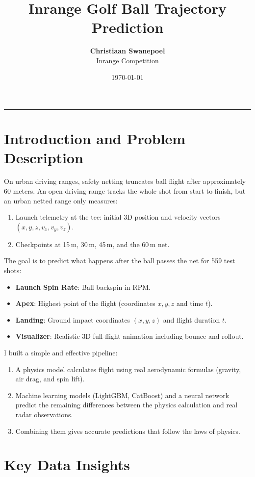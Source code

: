 \documentclass[11pt,a4paper]{article}
\title{\textbf{Inrange Golf Ball Trajectory Prediction}}
\author{\textbf{Christiaan Swanepoel} \\ Inrange Competition}
\date{\today}
\begin{document}
\maketitle

\hrule
\vspace{1em}

\section{Introduction and Problem Description}

On urban driving ranges, safety netting truncates ball flight after approximately 60 meters. An open driving range tracks the whole shot from start to finish, but an urban netted range only measures:
\begin{enumerate}
    \item Launch telemetry at the tee: initial 3D position and velocity vectors $(x, y, z, v_x, v_y, v_z)$.
    \item Checkpoints at 15\,m, 30\,m, 45\,m, and the 60\,m net.
\end{enumerate}

The goal is to predict what happens after the ball passes the net for 559 test shots:
\begin{itemize}
    \item \textbf{Launch Spin Rate}: Ball backspin in RPM.
    \item \textbf{Apex}: Highest point of the flight (coordinates $x, y, z$ and time $t$).
    \item \textbf{Landing}: Ground impact coordinates $(x, y, z)$ and flight duration $t$.
    \item \textbf{Visualizer}: Realistic 3D full-flight animation including bounce and rollout.
\end{itemize}

I built a simple and effective pipeline:
\begin{enumerate}
    \item A physics model calculates flight using real aerodynamic formulas (gravity, air drag, and spin lift).
    \item Machine learning models (LightGBM, CatBoost) and a neural network predict the remaining differences between the physics calculation and real radar observations.
    \item Combining them gives accurate predictions that follow the laws of physics.
\end{enumerate}

\section{Key Data Insights}
\end{document}
